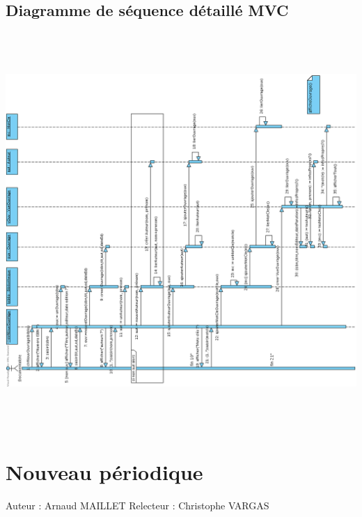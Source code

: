 \documentclass[a4paper,10pt]{report}
\begin{document}
\section*{Diagramme de séquence détaillé MVC}
\includegraphics[height=150mm]{NouvOuvrageMVC.png}

\newpage


\chapter*{Nouveau périodique}

Auteur : Arnaud MAILLET
Relecteur : Christophe VARGAS

\bigskip
\end{document}
